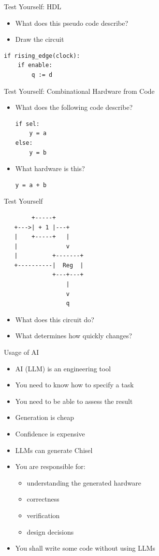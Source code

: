 \begin{frame}[fragile]{Test Yourself: HDL}
\begin{itemize}
\item What does this pseudo code describe?
\item Draw the circuit
\end{itemize}
\begin{verbatim}
if rising_edge(clock):
    if enable:
        q := d
\end{verbatim}
\end{frame}

\begin{frame}[fragile]{Test Yourself: Combinational Hardware from Code}
\begin{itemize}
\item What does the following code describe?
\begin{verbatim}
if sel:
    y = a
else:
    y = b
\end{verbatim}
\item What hardware is this?
\begin{verbatim}
y = a + b
\end{verbatim}
\end{itemize}
\end{frame}

\begin{frame}[fragile]{Test Yourself}
\begin{verbatim}
        +-----+
   +--->| + 1 |---+
   |    +-----+   |
   |              v
   |          +-------+
   +----------|  Reg  |
              +---+---+
                  |
                  v
                  q\end{verbatim}
\begin{itemize}
\item What does this circuit do?
\item What determines how quickly  changes?
\end{itemize}
\end{frame}

\begin{frame}[fragile]{Usage of AI}
\begin{itemize}
\item AI (LLM) is an engineering tool
\item You need to know how to specify a task
\item You need to be able to assess the result
\item Generation is cheap
\item Confidence is expensive
\item LLMs can generate Chisel
\item You are responsible for:
\begin{itemize}
\item understanding the generated hardware
\item correctness
\item verification
\item design decisions
\end{itemize}
\item You shall write some code without using LLMs
\end{itemize}
\end{frame}

